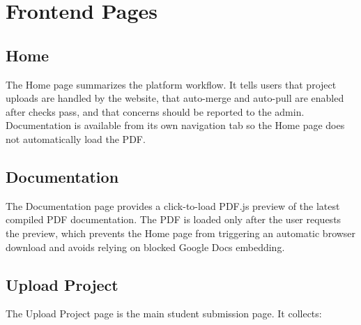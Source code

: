 \documentclass[12pt,a4paper]{article}
\begin{document}
\section{Frontend Pages}

\subsection{Home}

The Home page summarizes the platform workflow. It tells users that project uploads are handled by the website, that auto-merge and auto-pull are enabled after checks pass, and that concerns should be reported to the admin. Documentation is available from its own navigation tab so the Home page does not automatically load the PDF.

\subsection{Documentation}

The Documentation page provides a click-to-load PDF.js preview of the latest compiled PDF documentation. The PDF is loaded only after the user requests the preview, which prevents the Home page from triggering an automatic browser download and avoids relying on blocked Google Docs embedding.

\subsection{Upload Project}

The Upload Project page is the main student submission page. It collects:
\end{document}
